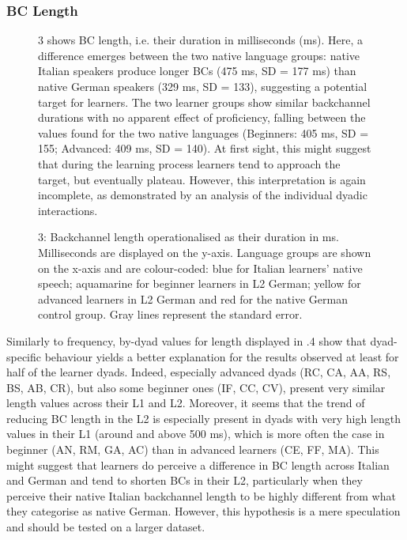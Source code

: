\subsubsection{BC Length}
\hypertarget{Toc191305952}{}\begin{figure}
\caption{3 shows BC length, i.e. their duration in milliseconds (ms). Here, a difference emerges between the two native language groups: native Italian speakers produce longer BCs (475 ms, SD = 177 ms) than native German speakers (329 ms, SD = 133), suggesting a potential target for learners. The two learner groups show similar backchannel durations with no apparent effect of proficiency, falling between the values found for the two native languages (Beginners: 405 ms, SD = 155; Advanced: 409 ms, SD = 140). At first sight, this might suggest that during the learning process learners tend to approach the target, but eventually plateau. However, this interpretation is again incomplete, as demonstrated by an analysis of the individual dyadic interactions.} 
\label{fig:key:4}
\end{figure}%
 

\begin{stylecaption}\begin{figure}
\caption{3: Backchannel length operationalised as their duration in ms. Milliseconds are displayed on the y-axis. Language groups are shown on the x-axis and are colour-coded: blue for Italian learners’ native speech; aquamarine for beginner learners in L2 German; yellow for advanced learners in L2 German and red for the native German control group. Gray lines represent the standard error.}
\label{fig:key:4}
\end{figure}\end{stylecaption}

Similarly to frequency, by-dyad values for length displayed in .4 show that dyad-specific behaviour yields a better explanation for the results observed at least for half of the learner dyads. Indeed, especially advanced dyads (RC, CA, AA, RS, BS, AB, CR), but also some beginner ones (IF, CC, CV), present very similar length values across their L1 and L2. Moreover, it seems that the trend of reducing BC length in the L2 is especially present in dyads with very high length values in their L1 (around and above 500 ms), which is more often the case in beginner (AN, RM, GA, AC) than in advanced learners (CE, FF, MA). This might suggest that learners do perceive a difference in BC length across Italian and German and tend to shorten BCs in their L2, particularly when they perceive their native Italian backchannel length to be highly different from what they categorise as native German. However, this hypothesis is a mere speculation and should be tested on a larger dataset.


